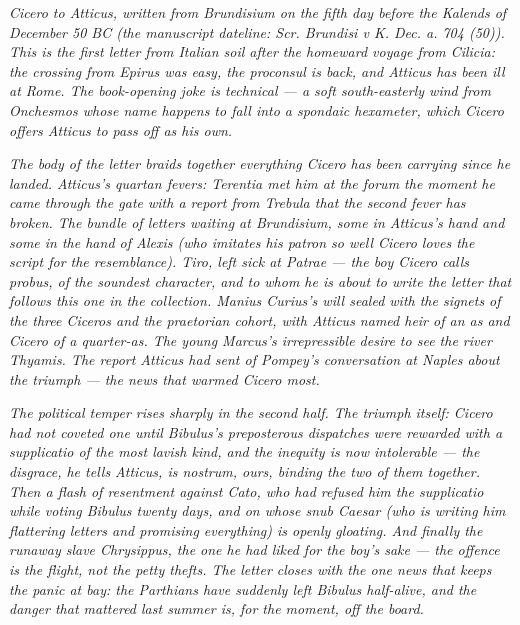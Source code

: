 
\textit{Cicero to Atticus, written from Brundisium on the fifth
day before the Kalends of December 50 BC (the manuscript
dateline: \textit{Scr. Brundisi v K. Dec. a. 704 (50)}). This
is the first letter from Italian soil after the homeward voyage
from Cilicia: the crossing from Epirus was easy, the proconsul
is back, and Atticus has been ill at Rome. The book-opening
joke is technical --- a soft south-easterly wind from Onchesmos
whose name happens to fall into a spondaic hexameter, which
Cicero offers Atticus to pass off as his own.}

\textit{The body of the letter braids together everything
Cicero has been carrying since he landed. Atticus's quartan
fevers: Terentia met him at the forum the moment he came
through the gate with a report from Trebula that the second
fever has broken. The bundle of letters waiting at Brundisium,
some in Atticus's hand and some in the hand of Alexis (who
imitates his patron so well Cicero loves the script for the
resemblance). Tiro, left sick at Patrae --- the boy Cicero
calls \emph{probus}, of the soundest character, and to whom
he is about to write the letter that follows this one in the
collection. Manius Curius's will sealed with the signets of
the three Ciceros and the praetorian cohort, with Atticus
named heir of an as and Cicero of a quarter-as. The young
Marcus's irrepressible desire to see the river Thyamis. The
report Atticus had sent of Pompey's conversation at Naples
about the triumph --- the news that warmed Cicero most.}

\textit{The political temper rises sharply in the second half.
The triumph itself: Cicero had not coveted one until Bibulus's
preposterous dispatches were rewarded with a supplicatio of the
most lavish kind, and the inequity is now intolerable --- the
disgrace, he tells Atticus, is \emph{nostrum}, ours, binding
the two of them together. Then a flash of resentment against
Cato, who had refused him the supplicatio while voting Bibulus
twenty days, and on whose snub Caesar (who is writing him
flattering letters and promising everything) is openly gloating.
And finally the runaway slave Chrysippus, the one he had
liked for the boy's sake --- the offence is the flight, not
the petty thefts. The letter closes with the one news that
keeps the panic at bay: the Parthians have suddenly left
Bibulus half-alive, and the danger that mattered last summer
is, for the moment, off the board.}
